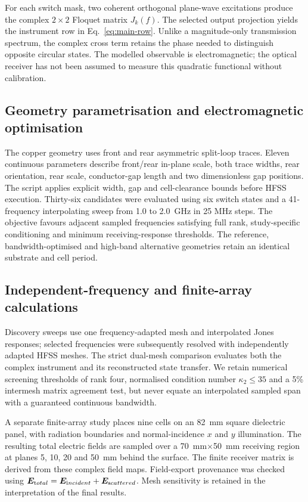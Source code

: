 \documentclass{ieeeaccess}
\begin{document}
For each switch mask, two coherent orthogonal plane-wave excitations produce the complex $2\times2$ Floquet matrix $J_k(f)$. The selected output projection yields the instrument row in Eq.~\eqref{eq:main-row}. Unlike a magnitude-only transmission spectrum, the complex cross term retains the phase needed to distinguish opposite circular states. The modelled observable is electromagnetic; the optical receiver has not been assumed to measure this quadratic functional without calibration.

\subsection{Geometry parametrisation and electromagnetic optimisation}
The copper geometry uses front and rear asymmetric split-loop traces. Eleven continuous parameters describe front/rear in-plane scale, both trace widths, rear orientation, rear scale, conductor-gap length and two dimensionless gap positions. The script applies explicit width, gap and cell-clearance bounds before HFSS execution. Thirty-six candidates were evaluated using six switch states and a 41-frequency interpolating sweep from 1.0 to 2.0~GHz in 25 MHz steps. The objective favours adjacent sampled frequencies satisfying full rank, study-specific conditioning and minimum receiving-response thresholds. The reference, bandwidth-optimised and high-band alternative geometries retain an identical substrate and cell period.

\subsection{Independent-frequency and finite-array calculations}
Discovery sweeps use one frequency-adapted mesh and interpolated Jones responses; selected frequencies were subsequently resolved with independently adapted HFSS meshes. The strict dual-mesh comparison evaluates both the complex instrument and its reconstructed state transfer. We retain numerical screening thresholds of rank four, normalised condition number $\kappa_2\le35$ and a 5\% intermesh matrix agreement test, but never equate an interpolated sampled span with a guaranteed continuous bandwidth.

A separate finite-array study places nine cells on an \SI{82}{mm} square dielectric panel, with radiation boundaries and normal-incidence $x$ and $y$ illumination. The resulting total electric fields are sampled over a \SI{70}{mm}$\times$\SI{50}{mm} receiving region at planes 5, 10, 20 and 50~mm behind the surface. The finite receiver matrix is derived from these complex field maps. Field-export provenance was checked using $\boldsymbol E_{\rm total}=\boldsymbol E_{\rm incident}+\boldsymbol E_{\rm scattered}$. Mesh sensitivity is retained in the interpretation of the final results.
\end{document}
